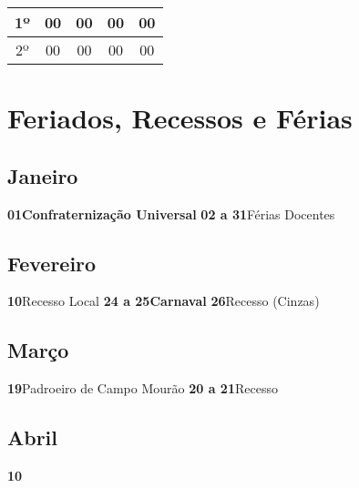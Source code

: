 \documentclass[thesis]{hmcposter}
\begin{document}
\begin{poster}
\begin{center}
\begin{table}
{\begin{tabular}{|c|c|c|c|c|}
1º & 00 & 00 & 00 & 00 \\ \hline
2º & 00 & 00 & 00 & 00 \\ \hline
\end{tabular}
}
\end{table}
\newline
\null
\newline
\end{center}
\vfill
\null
\newpage\onespacing \small \section{\color{hmcorange}Feriados, Recessos e Férias}\subsection{Janeiro}\textbf{01}\quad \quad \quad \quad \textbf{Confraternização Universal} \newline\textbf{02 a 31}\quad \quad Férias Docentes \newline\subsection{Fevereiro}\textbf{10}\quad \quad \quad \quad Recesso Local \newline\textbf{24 a 25}\quad \quad \textbf{Carnaval} \newline\textbf{26}\quad \quad \quad \quad Recesso (Cinzas) \newline\subsection{Março}\textbf{19}\quad \quad \quad \quad Padroeiro de Campo Mourão \newline\textbf{20 a 21}\quad \quad Recesso \newline\subsection{Abril}\textbf{10}\quad \
\end{poster}
\end{document}
